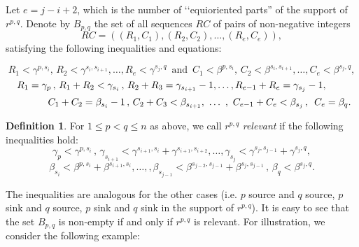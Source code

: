 \documentclass[twoside]{article}
\theoremstyle{definition}
\newtheorem{definition}[theorem]{Definition}
\begin{document}

\vspace{0.1in}

Let  $e=j-i+2$, which is the number of \lq\lq equioriented parts'' of the support of $r^{p,q}$. Denote by $B_{p,q}$ the set of all sequences $RC$ of pairs of non-negative integers 
$$RC=((R_1,C_1),(R_2,C_2),\dots,(R_e,C_e)),$$
satisfying the following inequalities and equations:

$$R_1<\gamma^{p,s_i},\, R_2<\gamma^{s_i,s_{i+1}},\dots, R_e < \gamma^{s_j,q}\, \text{ and }\, C_1<\beta^{p,s_i}, \, C_2<\beta^{s_i,s_{i+1}},\dots,C_e<\beta^{s_j,q},$$
$$R_1 = \gamma_p\,, \,R_1+R_2 < \gamma_{s_i}\,, \,R_2+R_3=\gamma_{s_{i+1}}-1, \dots , R_{e-1}+R_{e}=\gamma_{s_{j}}-1,\hspace{0.3in}$$
$$\hspace{0.5in}  C_1+C_2 = \beta_{s_i}-1\, , \, C_2+C_3<\beta_{s_{i+1}},\,\,\dots\,\,,\,\, C_{e-1}+C_{e} < \beta_{s_j}\,,\,\,\, C_e=\beta_q.$$

\vspace{0.1in}


\begin{definition}\label{def:relevant}
For $1\leq p < q \leq n$ as above,  we call $r^{p,q}$ \textit{relevant} if the following inequalities hold:
$$\gamma_p<\gamma^{p,s_i}\,,\,\gamma_{s_{i+1}}<\gamma^{s_{i+1},s_{i}}+\gamma^{s_{i+1},s_{i+2}},\dots, \gamma_{s_j}<\gamma^{s_{j},s_{j-1}}+\gamma^{s_{j},q}, $$
\[\beta_{s_i}<\beta^{p,s_{i}}+\beta^{s_{i+1},s_{i}}, \dots, ,\beta_{s_{j-1}}<\beta^{s_{j-2},s_{j-1}}+\beta^{s_{j},s_{j-1}}\,,\, \beta_q < \beta^{s_j,q}.\]
\end{definition}

The inequalities are analogous for the other cases (i.e. $p$ source and $q$ source, $p$ sink and $q$ source, $p$ sink and $q$ sink in the support of $r^{p,q}$). It is easy to see that the set $B_{p,q}$ is non-empty if and only if $r^{p,q}$ is relevant. For illustration, we consider the following example:
\end{document}
